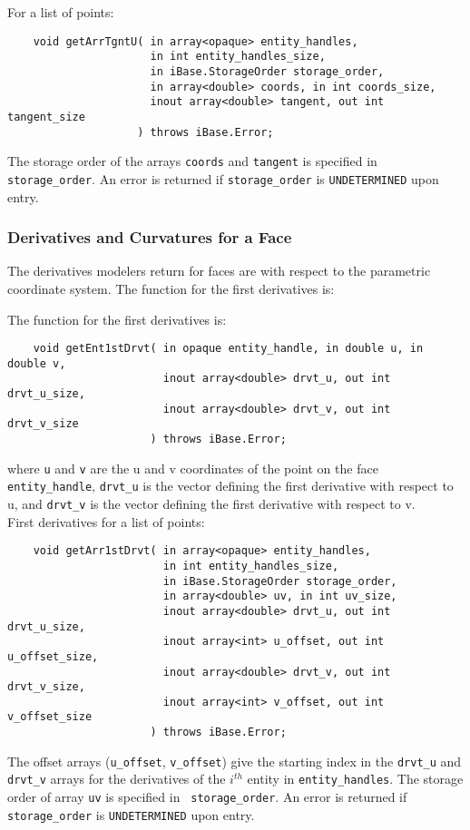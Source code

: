 \documentclass{article}
\begin{document}
\hspace{-16pt}For a list of points:

\begin{verbatim}
    void getArrTgntU( in array<opaque> entity_handles, 
                      in int entity_handles_size,
                      in iBase.StorageOrder storage_order,
                      in array<double> coords, in int coords_size,
                      inout array<double> tangent, out int tangent_size
                    ) throws iBase.Error;
\end{verbatim}
The storage order of the arrays {\tt coords} and {\tt tangent} is
 specified in {\tt storage\_order}. An error is returned if {\tt storage\_order}
 is {\tt UNDETERMINED} upon entry.

\subsubsection{Derivatives and Curvatures for a Face}

The derivatives modelers return for faces are with respect 
to the parametric coordinate system. The function for the first 
derivatives is:


The function for the first derivatives is:


\begin{verbatim}
    void getEnt1stDrvt( in opaque entity_handle, in double u, in double v,
                        inout array<double> drvt_u, out int drvt_u_size,
                        inout array<double> drvt_v, out int drvt_v_size
                      ) throws iBase.Error;
\end{verbatim}
where {\tt u} and {\tt v} are the u and v coordinates of 
the point on the face {\tt entity\_handle}, {\tt drvt\_u} is 
the vector defining the first derivative with respect to u, and {\tt drvt\_v} is 
the vector defining the first derivative with respect to v.\\

\hspace{-16pt}First derivatives for a list of points:

\begin{verbatim}
    void getArr1stDrvt( in array<opaque> entity_handles, 
                        in int entity_handles_size,
                        in iBase.StorageOrder storage_order,
                        in array<double> uv, in int uv_size,
                        inout array<double> drvt_u, out int drvt_u_size,
                        inout array<int> u_offset, out int u_offset_size,
                        inout array<double> drvt_v, out int drvt_v_size,
                        inout array<int> v_offset, out int v_offset_size
                      ) throws iBase.Error;
\end{verbatim}
The offset arrays ({\tt u\_offset}, {\tt v\_offset}) give the starting index in the
{\tt drvt\_u} and {\tt drvt\_v} arrays for the derivatives of the
{$i^{th}$} entity in {\tt entity\_handles}.
The storage order of array {\tt uv} is specified in {\tt
  storage\_order}. An error is returned if {\tt storage\_order}
 is {\tt UNDETERMINED} upon entry.\\
 
\end{document}
